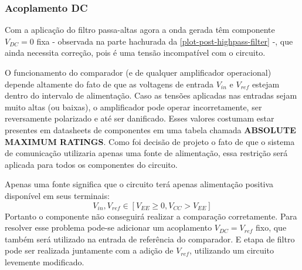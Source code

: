 	\subsubsection{Acoplamento DC}\label{method-hardware-dc-bias}
	Com a aplicação do filtro passa-altas agora a onda gerada têm componente $V_{DC} = 0$ fixa - observada na parte hachurada da \autoref{plot-post-highpass-filter} -, que ainda necessita correção, pois é uma tensão incompatível com o circuito.
	
	O funcionamento do comparador (e de qualquer amplificador operacional) depende altamente do fato de que as voltagens de entrada $V_{in}$ e $V_{ref}$ estejam dentro do intervalo de alimentação. Caso as tensões aplicadas nas entradas sejam muito altas (ou baixas), o amplificador pode operar incorretamente, ser reversamente polarizado e até ser danificado. Esses valores costumam estar presentes em datasheets de componentes em uma tabela chamada	\textbf{ABSOLUTE MAXIMUM RATINGS}. Como foi decisão de projeto o fato de que o sistema de comunicação utilizaria apenas uma fonte de alimentação, essa restrição será aplicada para todos os componentes do circuito.
	
	Apenas uma fonte significa que o circuito terá apenas alimentação positiva disponível em seus terminais: 
	\begin{equation}
	V_{in}, V_{ref} \in [V_{EE} \geq 0, V_{CC} > V_{EE}]
	\end{equation}
	Portanto o componente não conseguirá realizar a comparação corretamente. Para resolver esse problema pode-se adicionar um acoplamento $V_{DC} = V_{ref}$ fixo, que também será utilizado na entrada de referência do comparador. E etapa de filtro pode ser realizada juntamente com a adição de $V_{ref}$, utilizando um circuito levemente modificado.
	
